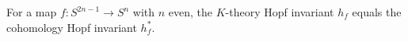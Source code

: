 For a map $f \colon S^{2n-1} \to S^n$ with $n$ even, the $K$-theory Hopf invariant $h_f$ equals the cohomology Hopf invariant $h_f^*$.
